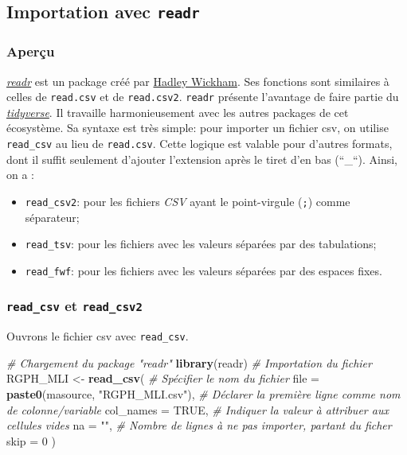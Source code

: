 \documentclass[]{book}
\newenvironment{Shaded}{\begin{snugshade}}{\end{snugshade}}
\newcommand{\KeywordTok}[1]{\textcolor[rgb]{0.13,0.29,0.53}{\textbf{#1}}}
\newcommand{\DataTypeTok}[1]{\textcolor[rgb]{0.13,0.29,0.53}{#1}}
\newcommand{\DecValTok}[1]{\textcolor[rgb]{0.00,0.00,0.81}{#1}}
\newcommand{\StringTok}[1]{\textcolor[rgb]{0.31,0.60,0.02}{#1}}
\newcommand{\CommentTok}[1]{\textcolor[rgb]{0.56,0.35,0.01}{\textit{#1}}}
\newcommand{\OtherTok}[1]{\textcolor[rgb]{0.56,0.35,0.01}{#1}}
\newcommand{\NormalTok}[1]{#1}
\begin{document}
\subsection{\texorpdfstring{Importation avec
\texttt{readr}}{Importation avec readr}}\label{importation-avec-readr}

\subsubsection{Aperçu}\label{apercu-1}

\href{https://readr.tidyverse.org/}{\emph{readr}} est un package créé
par \href{http://hadley.nz/}{Hadley Wickham}. Ses fonctions sont
similaires à celles de \texttt{read.csv} et de \texttt{read.csv2}.
\texttt{readr} présente l'avantage de faire partie du
\href{https://www.tidyverse.org/}{\emph{tidyverse}}. Il travaille
harmonieusement avec les autres packages de cet écosystème. Sa syntaxe
est très simple: pour importer un fichier csv, on utilise
\texttt{read\_csv} au lieu de \texttt{read.csv}. Cette logique est
valable pour d'autres formats, dont il suffit seulement d'ajouter
l'extension après le tiret d'en bas (``\_``). Ainsi, on a :

\begin{itemize}
\item
  \texttt{read\_csv2}: pour les fichiers \emph{CSV} ayant le
  point-virgule (\texttt{;}) comme séparateur;
\item
  \texttt{read\_tsv}: pour les fichiers avec les valeurs séparées par
  des tabulations;
\item
  \texttt{read\_fwf}: pour les fichiers avec les valeurs séparées par
  des espaces fixes.
\end{itemize}

\subsubsection{\texorpdfstring{\texttt{read\_csv} et
\texttt{read\_csv2}}{read\_csv et read\_csv2}}\label{read_csv-et-read_csv2}

Ouvrons le fichier csv avec \texttt{read\_csv}.

\begin{Shaded}
\begin{Highlighting}[]
\CommentTok{# Chargement du package "readr"}
\KeywordTok{library}\NormalTok{(readr) }
\CommentTok{# Importation du fichier}
\NormalTok{RGPH_MLI <-}\StringTok{ }\KeywordTok{read_csv}\NormalTok{(}
  \CommentTok{# Spécifier le nom du fichier}
  \DataTypeTok{file =} \KeywordTok{paste0}\NormalTok{(masource, }\StringTok{"RGPH_MLI.csv"}\NormalTok{), }
  \CommentTok{# Déclarer la première ligne comme nom de colonne/variable}
  \DataTypeTok{col_names =} \OtherTok{TRUE}\NormalTok{, }
  \CommentTok{# Indiquer la valeur à attribuer aux cellules vides }
  \DataTypeTok{na =} \StringTok{""}\NormalTok{, }
  \CommentTok{# Nombre de lignes à ne pas importer, partant du ficher}
  \DataTypeTok{skip =} \DecValTok{0}
\NormalTok{  )}
\end{Highlighting}
\end{Shaded}
\end{document}
